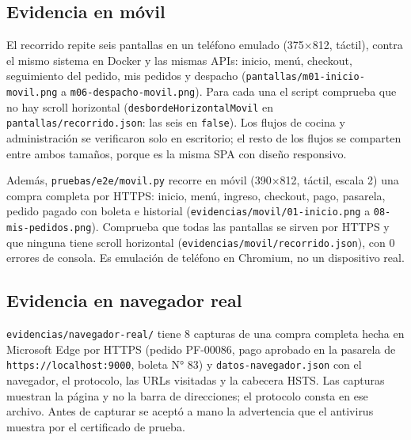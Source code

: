 \subsection{Evidencia en móvil}

El recorrido repite seis pantallas en un teléfono emulado (375×812, táctil), contra el mismo sistema en Docker y las mismas APIs: inicio, menú, checkout, seguimiento del pedido, mis pedidos y despacho (\texttt{pantallas/\allowbreak{}m01-\allowbreak{}inicio-\allowbreak{}movil.\allowbreak{}png} a \texttt{m06-\allowbreak{}despacho-\allowbreak{}movil.\allowbreak{}png}). Para cada una el script comprueba que no hay scroll horizontal (\texttt{desbordeHorizontalMovil} en \texttt{pantallas/\allowbreak{}recorrido.\allowbreak{}json}: las seis en \texttt{false}). Los flujos de cocina y administración se verificaron solo en escritorio; el resto de los flujos se comparten entre ambos tamaños, porque es la misma SPA con diseño responsivo.


Además, \texttt{pruebas/\allowbreak{}e2e/\allowbreak{}movil.\allowbreak{}py} recorre en móvil (390×812, táctil, escala 2) una compra completa por HTTPS: inicio, menú, ingreso, checkout, pago, pasarela, pedido pagado con boleta e historial (\texttt{evidencias/\allowbreak{}movil/\allowbreak{}01-\allowbreak{}inicio.\allowbreak{}png} a \texttt{08-\allowbreak{}mis-\allowbreak{}pedidos.\allowbreak{}png}). Comprueba que todas las pantallas se sirven por HTTPS y que ninguna tiene scroll horizontal (\texttt{evidencias/\allowbreak{}movil/\allowbreak{}recorrido.\allowbreak{}json}), con 0 errores de consola. Es emulación de teléfono en Chromium, no un dispositivo real.


\subsection{Evidencia en navegador real}

\texttt{evidencias/\allowbreak{}navegador-\allowbreak{}real/\allowbreak{}} tiene 8 capturas de una compra completa hecha en Microsoft Edge por HTTPS (pedido PF-00086, pago aprobado en la pasarela de \texttt{https:\allowbreak{}/\allowbreak{}/\allowbreak{}localhost:\allowbreak{}9000}, boleta N° 83) y \texttt{datos-\allowbreak{}navegador.\allowbreak{}json} con el navegador, el protocolo, las URLs visitadas y la cabecera HSTS. Las capturas muestran la página y no la barra de direcciones; el protocolo consta en ese archivo. Antes de capturar se aceptó a mano la advertencia que el antivirus muestra por el certificado de prueba.


